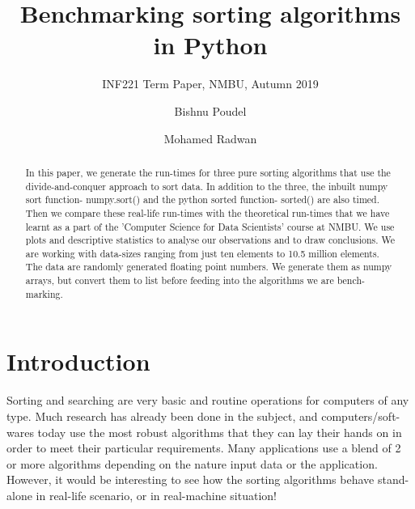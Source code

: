 \documentclass[sigconf, nonacm, natbib, screen, balance=False]{acmart}
\begin{document}
\title{Benchmarking sorting algorithms in Python}
\subtitle{INF221 Term Paper, NMBU, Autumn 2019}

\author{Bishnu Poudel}

\author{Mohamed Radwan}

\begin{abstract}

In this paper, we generate the run-times for three pure sorting algorithms that use the divide-and-conquer approach to sort data. In addition to the three, the inbuilt numpy sort function- numpy.sort() and the python sorted function- sorted() are also timed. Then we compare these real-life run-times with the theoretical run-times that we have learnt as a part of the 'Computer Science for Data Scientists' course at NMBU. We use plots and descriptive statistics to analyse our observations and to draw conclusions. We are working with data-sizes ranging from just ten elements to 10.5 million elements. The data are randomly generated floating point numbers. We generate them as numpy arrays, but convert them to list before feeding into the algorithms we are bench-marking.
\end{abstract}
\maketitle
\section{Introduction}\label{sec:intro}

Sorting and searching are very basic and routine operations for computers of any type. Much research has already been done in the subject, and computers/soft-wares today use the most robust algorithms that they can lay their hands on in order to meet their particular requirements. Many applications use a blend of 2 or more algorithms depending on the nature input data or the application. However, it would be interesting to see how the  sorting algorithms behave stand-alone in real-life scenario, or in real-machine situation!
\end{document}
